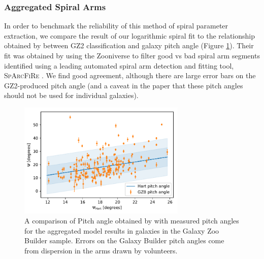 \documentclass[../main.tex]{subfiles}
\begin{document}



\subsubsection{Aggregated Spiral Arms}
In order to benchmark the reliability of this method of spiral parameter extraction, we compare the result of our logarithmic spiral fit to the relationship obtained by \citet{Hart2016:1607.01019v1} between GZ2 classification and galaxy pitch angle (Figure \ref{fig:hart_pitch_angle}). Their fit was obtained by using the Zooniverse to filter good vs bad spiral arm segments identified using a leading automated spiral arm detection and fitting tool, \textsc{SpArcFiRe} \citep{Davis2014:1402.1910v1}. We find good agreement, although there are large error bars on the GZ2-produced pitch angle (and a caveat in the paper that these pitch angles should not be used for individual galaxies).

\begin{figure}
  \includegraphics[width=8cm]{images__results/pitch-angle-comparison.pdf}
  \caption{A comparison of Pitch angle obtained by \citet{Hart2016:1607.01019v1} with measured pitch angles for the aggregated model results in galaxies in the Galaxy Zoo Builder sample. Errors on the Galaxy Builder pitch angles come from dispersion in the arms drawn by volunteers.}
  \label{fig:hart_pitch_angle}
\end{figure}
\end{document}
